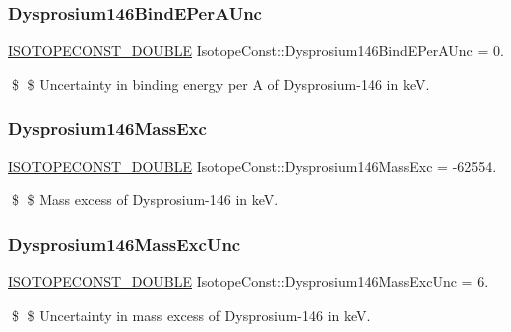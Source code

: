 \subsubsection{\texorpdfstring{Dysprosium146\+Bind\+E\+Per\+A\+Unc}{Dysprosium146BindEPerAUnc}}
{\footnotesize\ttfamily \mbox{\hyperlink{group___isotope_const-_macros_ga8f45a7272ce02c0b4c65c44636ed719a}{I\+S\+O\+T\+O\+P\+E\+C\+O\+N\+S\+T\+\_\+\+D\+O\+U\+B\+LE}} Isotope\+Const\+::\+Dysprosium146\+Bind\+E\+Per\+A\+Unc = 0.}

\$ \$ Uncertainty in binding energy per A of Dysprosium-\/146 in keV. \mbox{\label{group___isotope_const-_dysprosium-_dy146_ga44a482c1904fe6fb14463b3e7d9d8184}} 
\subsubsection{\texorpdfstring{Dysprosium146\+Mass\+Exc}{Dysprosium146MassExc}}
{\footnotesize\ttfamily \mbox{\hyperlink{group___isotope_const-_macros_ga8f45a7272ce02c0b4c65c44636ed719a}{I\+S\+O\+T\+O\+P\+E\+C\+O\+N\+S\+T\+\_\+\+D\+O\+U\+B\+LE}} Isotope\+Const\+::\+Dysprosium146\+Mass\+Exc = -\/62554.}

\$ \$ Mass excess of Dysprosium-\/146 in keV. \mbox{\label{group___isotope_const-_dysprosium-_dy146_ga5af090ce0e49cd6b373751d691953f7b}} 
\subsubsection{\texorpdfstring{Dysprosium146\+Mass\+Exc\+Unc}{Dysprosium146MassExcUnc}}
{\footnotesize\ttfamily \mbox{\hyperlink{group___isotope_const-_macros_ga8f45a7272ce02c0b4c65c44636ed719a}{I\+S\+O\+T\+O\+P\+E\+C\+O\+N\+S\+T\+\_\+\+D\+O\+U\+B\+LE}} Isotope\+Const\+::\+Dysprosium146\+Mass\+Exc\+Unc = 6.}

\$ \$ Uncertainty in mass excess of Dysprosium-\/146 in keV. \mbox{\label{group___isotope_const-_dysprosium-_dy146_ga5961f545e27fb69236c35eaa789cf016}} 
